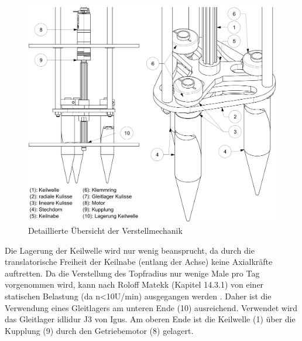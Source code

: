 	\begin{figure}[H]
	\includegraphics[scale=0.6]{Illustrationen/6-Umsetzung/details_vm.jpg}
	\caption{Detaillierte Übersicht der Verstellmechanik}
	\label{fig:details_vm}
	\end{figure}
Die Lagerung der Keilwelle wird nur wenig beansprucht, da durch die translatorische Freiheit der Keilnabe (entlang der Achse) keine Axialkräfte auftretten. Da die Verstellung des Topfradius nur wenige Male pro Tag vorgenommen wird, kann nach Roloff Matekk (Kapitel 14.3.1) von einer statischen Belastung (da n<10U/min) ausgegangen werden \cite{roloffmatek}. Daher ist die Verwendung eines Gleitlagers am unteren Ende (10) ausreichend. Verwendet wird das Gleitlager idlidur J3 von Igus. Am oberen Ende ist die Keilwelle (1) über die Kupplung (9) durch den Getriebemotor (8) gelagert.
\newline

